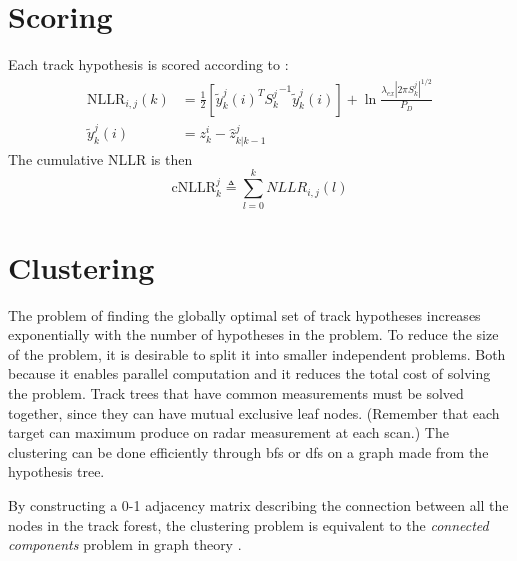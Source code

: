 \section{Scoring}
Each \gls{track hypothesis} is scored according to \cite{Bar-Shalom2007}:
\begin{equation}
\begin{split}
\mathrm{NLLR}_{i,j}(k) &= \frac{1}{2} \left[ {\tilde{y}_k^j}(i)^T {S_k^j}^{-1} {\tilde{y}_k^j}(i) \right] + \ln \frac{\lambda_{ex} |2 \pi S_k^j|^{1/2}}{P_D} \\				
\tilde{y}_k^j(i) &= z_k^i -\hat{z}_{k|k-1}^j
\end{split}
\end{equation}
The cumulative NLLR is then
\begin{equation}
\mathrm{cNLLR}_k^j \triangleq \sum_{l=0}^k NLLR_{i,j}(l)
\end{equation}

\section{Clustering}
The problem of finding the globally optimal set of track hypotheses increases exponentially with the number of hypotheses in the problem. To reduce the size of the problem, it is desirable to split it into smaller independent problems. Both because it enables parallel computation and it reduces the total cost of solving the problem. Track trees that have common measurements must be solved together, since they can have mutual exclusive leaf nodes. (Remember that each target can maximum produce on radar measurement at each scan.) The clustering can be done efficiently through \gls{bfs} or \gls{dfs} on a graph made from the hypothesis tree.

By constructing a 0-1 adjacency matrix describing the connection between all the nodes in the track forest, the clustering problem is equivalent to the \emph{connected components} problem in graph theory \cite{Chen2015}.

